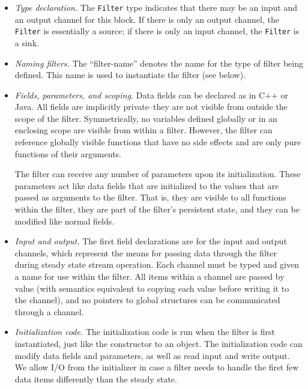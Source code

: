 \documentclass[draft]{article}
\begin{document}
\begin{itemize}

\item {\it Type declaration.}  The {\tt Filter} type indicates that
there may be an input and an output channel for this block.  If there is
only an output channel, the {\tt Filter} is essentially a source; if there is
only an input channel, the {\tt Filter} is a sink.

\item {\it Naming filters.}  The ``filter-name'' denotes the name for
the type of filter being defined.  This name is used to instantiate
the filter (see below).

\item {\it Fields, parameters, and scoping.}  Data fields can be
declared as in C++ or Java.  All fields are implicitly private--they
are not visible from outside the scope of the filter.  Symmetrically,
no variables defined globally or in an enclosing scope are visible
from within a filter.  However, the filter can reference globally
visible functions that have no side effects and are only pure
functions of their arguments.

The filter can receive any number of parameters upon its
initialization.  These parameters act like data fields that are
initialized to the values that are passed as arguments to the filter.
That is, they are visible to all functions within the filter, they are
part of the filter's persistent state, and they can be modified like
normal fields.

\item {\it Input and output.}  The first field declarations are for
the input and output channels, which represent the means for passing
data through the filter during steady state stream operation.  Each
channel must be typed and given a name for use within the filter.  All
items within a channel are passed by value (with semantics equivalent
to copying each value before writing it to the channel), and no
pointers to global structures can be communicated through a channel.

\item {\it Initialization code.}  The initialization code is run when
the filter is first instantiated, just like the constructor to an
object.  The initialization code can modify data fields and
parameters, as well as read input and write output.  We allow I/O from
the initializer in case a filter needs to handle the first few data
items differently than the steady state.


\end{itemize}
\end{document}
